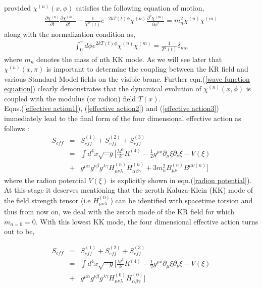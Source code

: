 \documentclass[a4paper]{article}
\begin{document}
provided $\chi^{(n)}(x,\phi)$ satisfies the following equation of motion, 
\begin{eqnarray}
 \frac{\partial\chi^{(n)}}{\partial t} \frac{\partial\chi^{(m)}}{\partial t} 
 - \frac{1}{T^2(t)}e^{-2kT(t)\phi}\chi^{(n)}\frac{\partial^2\chi^{(m)}}{\partial\phi^2} = m_n^2\chi^{(n)}\chi^{(m)}
 \label{wave function equation}
\end{eqnarray}
along with the normalization condition  as,
\begin{eqnarray}
 \int_0^{\pi} d\phi e^{2kT(t)\phi}\chi^{(n)}\chi^{(m)} = \frac{1}{T^2(t)}\delta_{mn}
 \label{wave function normalization}
\end{eqnarray}
where $m_n$ denotes the mass of nth KK mode. As we will see later that $\chi^{(n)}(x,\pi)$ is important to determine 
the coupling between the KR field and various Standard Model fields on the visible brane. 
Further eqn.(\ref{wave function equation}) clearly demonstrates that the dynamical evolution of $\chi^{(n)}(x,\phi)$ 
is coupled with the modulus (or radion) field $T(x)$.\\

Eqns.(\ref{effective action1}), (\ref{effective action2}) and (\ref{effective action3}) immediately lead to the final form of the four dimensional 
effective action as follows :
\begin{eqnarray}
 S_{eff}&=&S_{eff}^{(1)} + S_{eff}^{(2)} + S_{eff}^{(3)}\nonumber\\
 &=&\int d^4x\sqrt{-g}\bigg[\frac{M^3}{k}R^{(4)} - \frac{1}{2}g^{\mu\nu}\partial_{\mu}\xi\partial_{\nu}\xi - V(\xi)\nonumber\\
 &+&g^{\mu\alpha}g^{\nu\beta}g^{\lambda\gamma}H_{\mu\nu\lambda}^{(n)}H_{\alpha\beta\gamma}^{(n)} 
 + 3m_n^2 B_{\mu\nu}^{(n)}B^{\mu\nu(n)}\bigg]
 \label{full effective action_secondary}
\end{eqnarray}
where the radion potential $V(\xi)$ is explicitly shown in eqn.(\ref{radion potential}). At this stage it deserves mentioning that 
the zeroth Kaluza-Klein (KK) mode of the field strength tensor (i.e $H^{(0)}_{\mu\nu\lambda}$) can be identified 
with spacetime torsion and thus from now on, we deal with the zeroth mode of the KR field for which $m_{n=0} = 0$. With this 
lowest KK mode, the four dimensional effective action turns out to be,

\begin{eqnarray}
 S_{eff}&=&S_{eff}^{(1)} + S_{eff}^{(2)} + S_{eff}^{(3)}\nonumber\\
 &=&\int d^4x\sqrt{-g}\bigg[\frac{M^3}{k}R^{(4)} - \frac{1}{2}g^{\mu\nu}\partial_{\mu}\xi\partial_{\nu}\xi - V(\xi)\nonumber\\ 
 &+&g^{\mu\alpha}g^{\nu\beta}g^{\lambda\gamma}H_{\mu\nu\lambda}^{(0)}H_{\alpha\beta\gamma}^{(0)}\bigg]
 \label{full effective action}
\end{eqnarray} 
\end{document}
